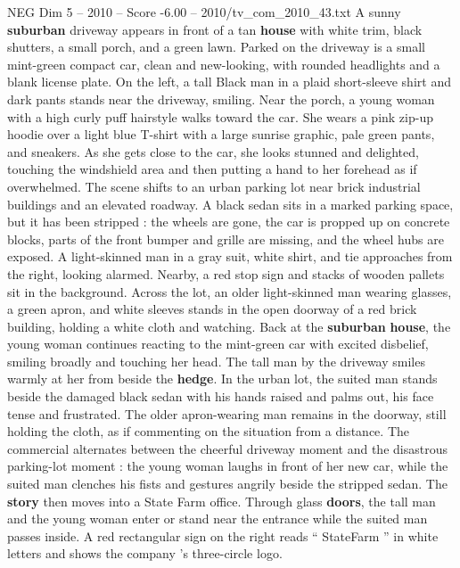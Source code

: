 \begin{textsample}{NEG Dim 5 – 2010 – Score -6.00 – 2010/tv\_com\_2010\_43.txt}  \label{ex:f5_neg_052}
A sunny \textbf{suburban} driveway appears in front of a tan \textbf{house} with white trim, black shutters, a small porch, and a green lawn.
Parked on the driveway is a small mint-green compact car, clean and new-looking, with rounded headlights and a blank license plate.
On the left, a tall Black man in a plaid short-sleeve shirt and dark pants stands near the driveway, smiling.
Near the porch, a young woman with a high curly puff hairstyle walks toward the car.
She wears a pink zip-up hoodie over a light blue T-shirt with a large sunrise graphic, pale green pants, and sneakers.
As she gets close to the car, she looks stunned and delighted, touching the windshield area and then putting a hand to her forehead as if overwhelmed.
The scene shifts to an urban parking lot near brick industrial buildings and an elevated roadway.
A black sedan sits in a marked parking space, but it has been stripped : the wheels are gone, the car is propped up on concrete blocks, parts of the front bumper and grille are missing, and the wheel hubs are exposed.
A light-skinned man in a gray suit, white shirt, and tie approaches from the right, looking alarmed.
Nearby, a red stop sign and stacks of wooden pallets sit in the background.
Across the lot, an older light-skinned man wearing glasses, a green apron, and white sleeves stands in the open doorway of a red brick building, holding a white cloth and watching.
Back at the \textbf{suburban} \textbf{house}, the young woman continues reacting to the mint-green car with excited disbelief, smiling broadly and touching her head.
The tall man by the driveway smiles warmly at her from beside the \textbf{hedge}.
In the urban lot, the suited man stands beside the damaged black sedan with his hands raised and palms out, his face tense and frustrated.
The older apron-wearing man remains in the doorway, still holding the cloth, as if commenting on the situation from a distance.
The commercial alternates between the cheerful driveway moment and the disastrous parking-lot moment : the young woman laughs in front of her new car, while the suited man clenches his fists and gestures angrily beside the stripped sedan.
The \textbf{story} then moves into a State Farm office.
Through glass \textbf{doors}, the tall man and the young woman enter or stand near the entrance while the suited man passes inside.
A red rectangular sign on the right reads “ StateFarm ” in white letters and shows the company ’s three-circle logo.

\end{textsample}
